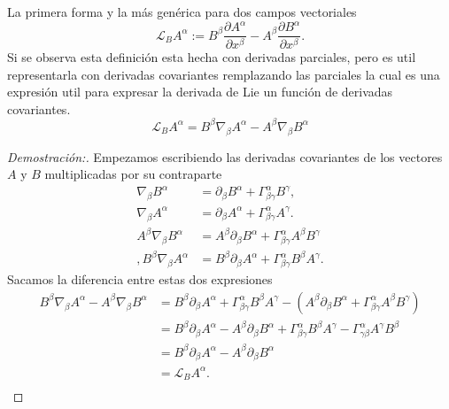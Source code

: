 \noindent La primera forma y la más genérica para dos campos vectoriales
\begin{equation}
    \mathscr{L}_B A^\alpha := B^\beta \frac{\partial A^\alpha}{\partial x^\beta}-A^\beta \frac{\partial B^\alpha}{\partial x^\beta}.
\end{equation}
Si se observa esta definición esta hecha con derivadas parciales, pero es util representarla con derivadas covariantes remplazando las parciales la cual es una expresión util para expresar la derivada de Lie un función de derivadas covariantes.
\begin{equation}
    \boxed{\mathscr{L}_B A^\alpha = B^\beta \nabla_\beta A^\alpha  - A^\beta \nabla_\beta B^\alpha }
\end{equation}
\begin{proof}[Demostración:]
    Empezamos escribiendo las derivadas covariantes de los vectores $A$ y $B$ multiplicadas por su contraparte
    \begin{align*}
        \nabla_\beta B^\alpha & =\partial_\beta B^\alpha+\Gamma_{\beta \gamma}^\alpha B^\gamma ,\\
        \nabla_\beta A^\alpha & =\partial_\beta A^\alpha+\Gamma_{\beta \gamma}^\alpha A^\gamma .\\
        A^\beta \nabla_\beta B^\alpha & =A^\beta \partial_\beta B^\alpha+\Gamma_{\beta \gamma}^\alpha A^\beta B^\gamma  \\,
        B^\beta \nabla_\beta A^\alpha & =B^\beta \partial_\beta A^\alpha+\Gamma_{\beta \gamma}^\alpha B^\beta A^\gamma.
    \end{align*}
    Sacamos la diferencia entre estas dos expresiones
    \begin{equation}
        \begin{aligned}
            B^\beta \nabla_\beta A^\alpha  - A^\beta \nabla_\beta B^\alpha & = B^\beta \partial_\beta A^\alpha+\Gamma_{\beta \gamma}^\alpha B^\beta A^\gamma- (A^\beta \partial_\beta B^\alpha+\Gamma_{\beta \gamma}^\alpha A^\beta B^\gamma )   \\
                                                                           & = B^\beta \partial_\beta A^\alpha - A^\beta \partial_\beta B^\alpha+\Gamma_{\beta \gamma}^\alpha  B^\beta A^\gamma -\Gamma_{ \gamma \beta}^\alpha A^\gamma  B^\beta \\
                                                                           & =B^\beta \partial_\beta A^\alpha - A^\beta \partial_\beta B^\alpha                                                                                                  \\
                                                                           & = \mathscr{L}_B A^\alpha .                                                                                                                                          \\
        \end{aligned}
    \end{equation}
\end{proof}

